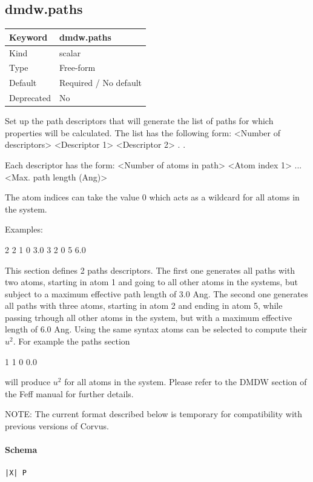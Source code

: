 \documentclass[11pt]{article}
\begin{document}
\subsection{dmdw.paths}
\label{kw:dmdw-paths}
\begin{longtable}{|p{1.5in}|p{4.5in}|}
\hline
Keyword & dmdw.paths \\
\hline
Kind & scalar \\
\hline
Type & Free-form \\
\hline
Default & Required / No default \\
\hline
Deprecated & No \\
\hline
\end{longtable}
 Set up the path descriptors that will generate the list of paths for which
 properties will be calculated. The list has the following form:
   <Number of descriptors>
     <Descriptor 1>
     <Descriptor 2>
    .
    .

 Each descriptor has the form:
   <Number of atoms in path> <Atom index 1> ... <Max. path length (Ang)>

 The atom indices can take the value 0 which acts as a wildcard for all atoms
 in the system.

 Examples:

 2
 2 1 0   3.0
 3 2 0 5 6.0

 This section defines 2 paths descriptors. The first one generates all paths
 with two atoms, starting in atom 1 and going to all other atoms in the
 systems, but subject to a maximum effective path length of 3.0 Ang. The
 second one generates all paths with three atoms, starting in atom 2 and
 ending in atom 5, while passing trhough all other atoms in the system, but
 with a maximum effective length of 6.0 Ang.
 Using the same syntax atoms can be selected to compute their $u^2$. For example
 the paths section

 1
 1 0 0.0

 will produce $u^2$ for all atoms in the system. Please refer to the DMDW
 section of the Feff manual for further details.

 NOTE: The current format described below is temporary for compatibility with
 previous versions of Corvus.

\paragraph{Schema}
\begin{Verbatim}
|X| P
\end{Verbatim}
\end{document}

